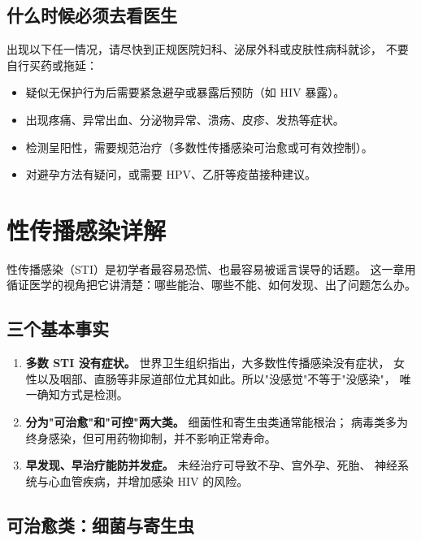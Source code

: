 \section{什么时候必须去看医生}

出现以下任一情况，请尽快到正规医院妇科、泌尿外科或皮肤性病科就诊，
不要自行买药或拖延：

\begin{itemize}
  \item 疑似无保护行为后需要紧急避孕或暴露后预防（如 HIV 暴露）。
  \item 出现疼痛、异常出血、分泌物异常、溃疡、皮疹、发热等症状。
  \item 检测呈阳性，需要规范治疗（多数性传播感染可治愈或可有效控制）。
  \item 对避孕方法有疑问，或需要 HPV、乙肝等疫苗接种建议。
\end{itemize}

\chapter{性传播感染详解}
\label{chap:sti}

性传播感染（STI）是初学者最容易恐慌、也最容易被谣言误导的话题。
这一章用循证医学的视角把它讲清楚：哪些能治、哪些不能、如何发现、出了问题怎么办。

\section{三个基本事实}

\begin{enumerate}[leftmargin=2em,itemsep=0.3em]
  \item \textbf{多数 STI 没有症状。} 世界卫生组织指出，大多数性传播感染没有症状，
        女性以及咽部、直肠等非尿道部位尤其如此。所以"没感觉"不等于"没感染"，
        唯一确知方式是检测。
  \item \textbf{分为"可治愈"和"可控"两大类。} 细菌性和寄生虫类通常能根治；
        病毒类多为终身感染，但可用药物抑制，并不影响正常寿命。
  \item \textbf{早发现、早治疗能防并发症。} 未经治疗可导致不孕、宫外孕、死胎、
        神经系统与心血管疾病，并增加感染 HIV 的风险。
\end{enumerate}

\section{可治愈类：细菌与寄生虫}

